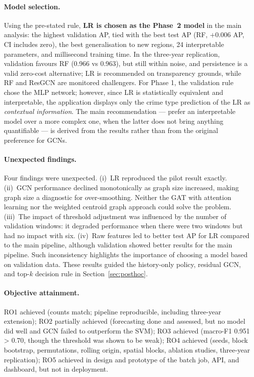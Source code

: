 \documentclass[11pt,a4paper]{report}
\begin{document}
\paragraph{Model selection.} Using the pre-stated rule, \textbf{LR is chosen as the Phase~2 model} in the main analysis: the highest validation AP, tied with the best test AP (RF, $+0.006$ AP, CI includes zero), the best generalisation to new regions, 24 interpretable parameters, and millisecond training time. In the three-year replication, validation favours RF (0.966 vs 0.963), but still within noise, and persistence is a valid zero-cost alternative; LR is recommended on transparency grounds, while RF and ResGCN are monitored challengers. For Phase 1, the validation rule chose the MLP network; however, since LR is statistically equivalent and interpretable, the application displays only the crime type prediction of the LR as \emph{contextual information}. The main recommendation --- prefer an interpretable model over a more complex one, when the latter does not bring anything quantifiable --- is derived from the results rather than from the original preference for GCNs.



\paragraph{Unexpected findings.} Four findings were unexpected. (i)~LR reproduced the pilot result exactly. (ii)~GCN performance declined monotonically as graph size increased, making graph size a diagnostic for over-smoothing. Neither the GAT with attention learning nor the weighted centroid graph approach could solve the problem. (iii)~The impact of threshold adjustment was influenced by the number of validation windows: it degraded performance when there were two windows but had no impact with six. (iv)~Raw features led to better test AP for LR compared to the main pipeline, although validation showed better results for the main pipeline. Such inconsistency highlights the importance of choosing a model based on validation data. These results guided the history-only policy, residual GCN, and top-$k$ decision rule in Section~\ref{sec:posthoc}.

\paragraph{Objective attainment.} RO1 achieved (counts match; pipeline reproducible, including three-year extension); RO2 partially achieved (forecasting done and assessed, but no model did well and GCN failed to outperform the SVM); RO3 achieved (macro-F1 0.951 > 0.70, though the threshold was shown to be weak); RO4 achieved (seeds, block bootstrap, permutations, rolling origin, spatial blocks, ablation studies, three-year replication); RO5 achieved in design and prototype of the batch job, API, and dashboard, but not in deployment.
\end{document}
